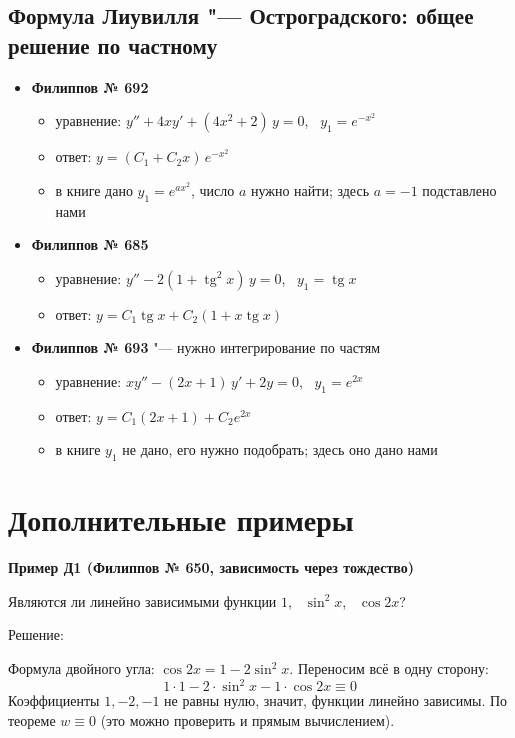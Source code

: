 \documentclass[11pt,a4paper]{article}
\newcommand{\example}[1]{\par\medskip\noindent\textbf{#1}\par\nopagebreak\smallskip}
\begin{document}
\subsection*{Формула Лиувилля "--- Остроградского: общее решение по частному}
\begin{itemize}[topsep=2pt]
  \item \textbf{Филиппов № 692}
  \begin{itemize}
    \item уравнение: $y'' + 4xy' + (4x^2 + 2)\, y = 0$, \ $y_1 = e^{-x^2}$
    \item ответ: $y = (C_1 + C_2 x)\, e^{-x^2}$
    \item в книге дано $y_1 = e^{ax^2}$, число $a$ нужно найти; здесь $a = -1$ подставлено нами
  \end{itemize}
  \item \textbf{Филиппов № 685}
  \begin{itemize}
    \item уравнение: $y'' - 2(1 + \operatorname{tg}^2 x)\, y = 0$, \ $y_1 = \operatorname{tg} x$
    \item ответ: $y = C_1 \operatorname{tg} x + C_2 (1 + x \operatorname{tg} x)$
  \end{itemize}
  \item \textbf{Филиппов № 693} "--- нужно интегрирование по частям
  \begin{itemize}
    \item уравнение: $x y'' - (2x + 1)\, y' + 2y = 0$, \ $y_1 = e^{2x}$
    \item ответ: $y = C_1 (2x + 1) + C_2 e^{2x}$
    \item в книге $y_1$ не дано, его нужно подобрать; здесь оно дано нами
  \end{itemize}
\end{itemize}

\newpage

\section*{Дополнительные примеры}

\example{Пример Д1 (Филиппов № 650, зависимость через тождество)}

Являются ли линейно зависимыми функции $1$, \ $\sin^2 x$, \ $\cos 2x$?

Решение:

Формула двойного угла: $\cos 2x = 1 - 2\sin^2 x$. Переносим всё в одну сторону:
\[
  1 \cdot 1 - 2 \cdot \sin^2 x - 1 \cdot \cos 2x \equiv 0
\]
Коэффициенты $1, -2, -1$ не равны нулю, значит, функции линейно зависимы. По теореме $w \equiv 0$ (это можно проверить и прямым вычислением).
\end{document}
